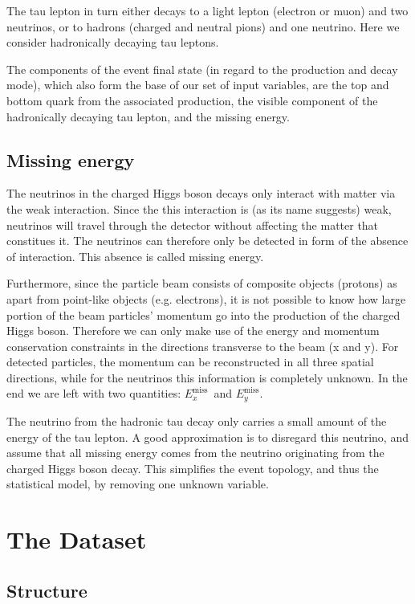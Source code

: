 \documentclass{scrartcl}
\newcommand{\exmiss}{$E_x^\text{miss}$}
\newcommand{\eymiss}{$E_y^\text{miss}$}
\begin{document}
The tau lepton in turn either decays to a light lepton (electron or muon) and two neutrinos, or to hadrons (charged and neutral pions) and one neutrino. Here we consider hadronically decaying tau leptons.

The components of the event final state (in regard to the production and decay mode), which also form the base of our set of input variables, are the top and bottom quark from the associated production, the visible component of the hadronically decaying tau lepton, and the missing energy.

\subsection{Missing energy}
The neutrinos in the charged Higgs boson decays only interact with matter via the weak interaction. Since the this interaction is (as its name suggests) weak, neutrinos will travel through the detector without affecting the matter that constitues it. The neutrinos can therefore only be detected in form of the absence of interaction. This absence is called missing energy.

Furthermore, since the particle beam consists of composite objects (protons) as apart from point-like objects (e.g. electrons), it is not possible to know how large portion of the beam particles' momentum go into the production of the charged Higgs boson. Therefore we can only make use of the energy and momentum conservation constraints in the directions transverse to the beam (x and y). For detected particles, the momentum can be reconstructed in all three spatial directions, while for the neutrinos this information is completely unknown. In the end we are left with two quantities: \exmiss\ and \eymiss.

The neutrino from the hadronic tau decay only carries a small amount of the energy of the tau lepton. A good approximation is to disregard this neutrino, and assume that all missing energy comes from the neutrino originating from the charged Higgs boson decay. This simplifies the event topology, and thus the statistical model, by removing one unknown variable.

\section{The Dataset}
\subsection{Structure}
\end{document}
